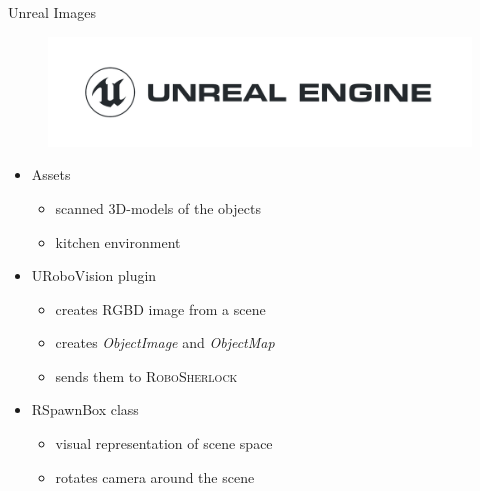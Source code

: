 \documentclass[]{beamer}
\begin{document}
\begin{frame}{Unreal Images}
	\begin{figure}
		\includegraphics[scale=.12]{img/Unreal_Engine_Horiz_Black.png}
	\end{figure}
	\begin{itemize}
		\item Assets
			\begin{itemize}
				\item scanned 3D-models of the objects
				\item kitchen environment
			\end{itemize}
		\item URoboVision plugin
			\begin{itemize}
				\item creates RGBD image from a scene
				\item creates \textit{ObjectImage} and  \textit{ObjectMap} 
				\item sends them to \textsc{RoboSherlock}
			\end{itemize}
		\item RSpawnBox class
			\begin{itemize}
				\item visual representation of scene space
				\item rotates camera around the scene
			\end{itemize}
	\end{itemize}
\end{frame}
\end{document}
